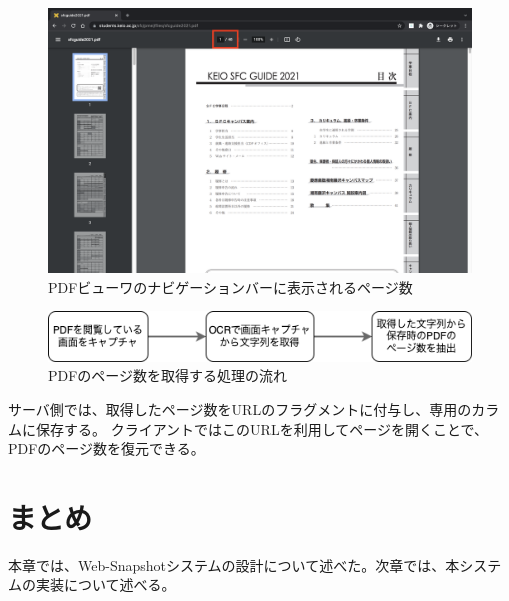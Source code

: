 \begin{figure}[htbp]
  \caption{PDFビューワのナビゲーションバーに表示されるページ数}
  \label{fig:pdf-viewer-nav-bar-page-num}
  \begin{center}
    \includegraphics[bb=0 0 1440 900,width=15cm]{img/040_design/pdf-viewer-nav-bar-page-num.pdf}
  \end{center}
\end{figure}

\begin{figure}[htbp]
  \caption{PDFのページ数を取得する処理の流れ}
  \label{fig:design-pdf-page-num-extract}
  \begin{center}
    \includegraphics[bb=0 0 511 61,width=15cm]{img/040_design/design-pdf-page-num-extract.pdf}
  \end{center}
\end{figure}

サーバ側では、取得したページ数をURLのフラグメントに付与し、専用のカラムに保存する。
クライアントではこのURLを利用してページを開くことで、PDFのページ数を復元できる。

\section{まとめ}
本章では、Web-Snapshotシステムの設計について述べた。次章では、本システムの実装について述べる。
